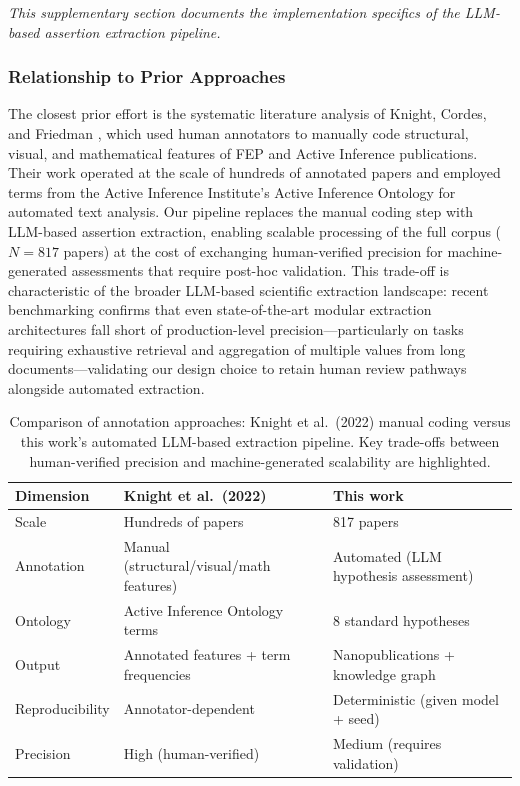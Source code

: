 \documentclass[
  english,
]{article}
\begin{document}
\emph{This supplementary section documents the implementation specifics
of the LLM-based assertion extraction pipeline.}

\subsubsection{Relationship to Prior
Approaches}\label{relationship-to-prior-approaches}

The closest prior effort is the systematic literature analysis of
Knight, Cordes, and Friedman \citep{knight2022fep}, which used human
annotators to manually code structural, visual, and mathematical
features of FEP and Active Inference publications. Their work operated
at the scale of hundreds of annotated papers and employed terms from the
Active Inference Institute's Active Inference Ontology for automated
text analysis. Our pipeline replaces the manual coding step with
LLM-based assertion extraction, enabling scalable processing of the full
corpus (\(N = 817\) papers) at the cost of exchanging human-verified
precision for machine-generated assessments that require post-hoc
validation. This trade-off is characteristic of the broader LLM-based
scientific extraction landscape: recent benchmarking confirms that even
state-of-the-art modular extraction architectures fall short of
production-level precision---particularly on tasks requiring exhaustive
retrieval and aggregation of multiple values from long
documents---validating our design choice to retain human review pathways
alongside automated extraction.

\begin{table}[htbp]
\centering
\caption{Comparison of annotation approaches: Knight et al.\ (2022) manual coding versus this work's automated LLM-based extraction pipeline. Key trade-offs between human-verified precision and machine-generated scalability are highlighted.}
\label{tab:annotation_comparison}
\begin{tabular}{lll}
\toprule
\textbf{Dimension} & \textbf{Knight et al.\ (2022)} & \textbf{This work} \\
\midrule
Scale & Hundreds of papers & 817 papers \\
Annotation & Manual (structural/visual/math features) & Automated (LLM hypothesis assessment) \\
Ontology & Active Inference Ontology terms & 8 standard hypotheses \\
Output & Annotated features + term frequencies & Nanopublications + knowledge graph \\
Reproducibility & Annotator-dependent & Deterministic (given model + seed) \\
Precision & High (human-verified) & Medium (requires validation) \\
\bottomrule
\end{tabular}
\end{table}
\end{document}
